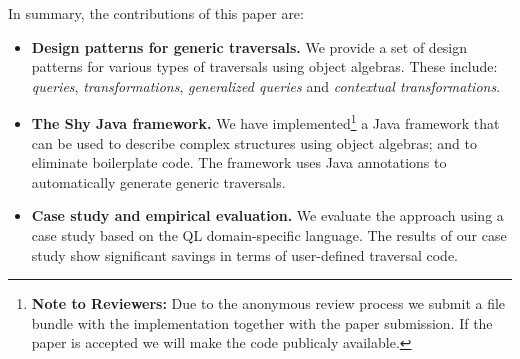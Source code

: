 In summary, the contributions of this paper are:

\begin{itemize}

\item {\bf Design patterns for generic traversals.} We provide a set of design 
patterns for various types of traversals using object algebras. These include: 
\emph{queries}, \emph{transformations},
\emph{generalized queries} and \emph{contextual transformations}.

\item {\bf The Shy Java framework.} We have implemented\footnote{{\bf
      Note to Reviewers:} Due to the anonymous review process we
    submit a file bundle with the implementation together with the paper submission. If the
    paper is accepted we will make the code publicaly available.} a
  Java framework that can be used to describe complex structures using
  object algebras; and to eliminate boilerplate code. The framework
  uses Java annotations to automatically generate generic traversals.
 

\item {\bf Case study and empirical evaluation.} We evaluate the
  approach using a case study based on the QL domain-specific
  language. The results of our case study show significant savings in
  terms of user-defined traversal code.
\end{itemize}
